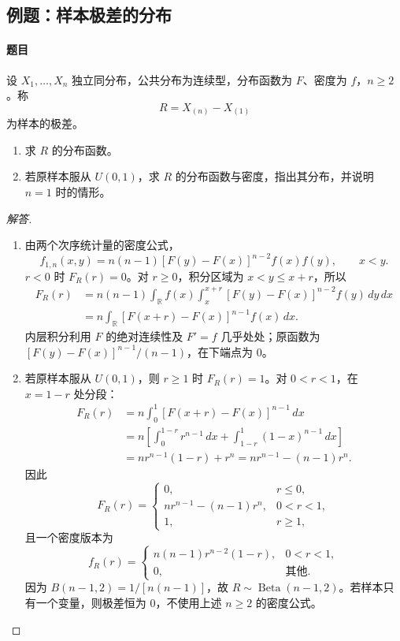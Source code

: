 \subsection{例题：样本极差的分布}\label{note:c3:e17}
\paragraph{题目}
设 $X_1,\ldots,X_n$ 独立同分布，公共分布为连续型，分布函数为 $F$、密度为 $f$，$n\geq2$。称
\[R=X_{(n)}-X_{(1)}\]
为样本的极差。
\begin{enumerate}
\item 求 $R$ 的分布函数。

\item 若原样本服从 $U(0,1)$，求 $R$ 的分布函数与密度，指出其分布，并说明 $n=1$ 时的情形。
\end{enumerate}

\begin{proof}[解答]
\begin{enumerate}
\item 由两个次序统计量的密度公式，
\[
f_{1,n}(x,y)=n(n-1)[F(y)-F(x)]^{n-2}f(x)f(y),
\qquad x<y.
\]
$r<0$ 时 $F_R(r)=0$。对 $r\geq0$，积分区域为 $x<y\leq x+r$，所以
\begin{align*}
F_R(r)
&=n(n-1)\int_{\mathbb R}f(x)
 \int_x^{x+r}[F(y)-F(x)]^{n-2}f(y)\,dy\,dx\\
&=n\int_{\mathbb R}[F(x+r)-F(x)]^{n-1}f(x)\,dx.
\end{align*}
内层积分利用 $F$ 的绝对连续性及 $F'=f$ 几乎处处；原函数为
$[F(y)-F(x)]^{n-1}/(n-1)$，在下端点为 $0$。

\item 若原样本服从 $U(0,1)$，则 $r\geq1$ 时 $F_R(r)=1$。对 $0<r<1$，在 $x=1-r$ 处分段：
\begin{align*}
F_R(r)
&=n\int_0^1[F(x+r)-F(x)]^{n-1}\,dx\\
&=n\left[\int_0^{1-r}r^{n-1}\,dx+
 \int_{1-r}^1(1-x)^{n-1}\,dx\right]\\
&=nr^{n-1}(1-r)+r^n
=nr^{n-1}-(n-1)r^n.
\end{align*}
因此
\[
F_R(r)=
\begin{cases}
0,&r\leq0,\\
nr^{n-1}-(n-1)r^n,&0<r<1,\\
1,&r\geq1,
\end{cases}
\]
且一个密度版本为
\[
f_R(r)=
\begin{cases}
n(n-1)r^{n-2}(1-r),&0<r<1,\\
0,&\text{其他}.
\end{cases}
\]
因为 $B(n-1,2)=1/[n(n-1)]$，故 $R\sim\operatorname{Beta}(n-1,2)$。若样本只有一个变量，则极差恒为 $0$，不使用上述 $n\geq2$ 的密度公式。
\end{enumerate}
\end{proof}

